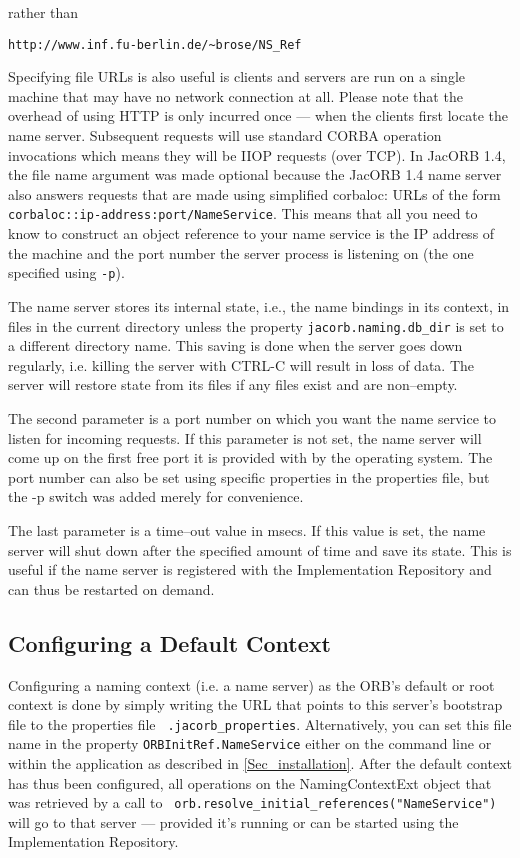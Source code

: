 \documentclass[12pt]{scrbook}
\begin{document}

rather than

\noindent\verb+http://www.inf.fu-berlin.de/~brose/NS_Ref+

Specifying file URLs is also useful is clients and servers are run on
a single machine that may have no network connection at all. Please
note that the overhead of using HTTP is only incurred once --- when
the clients first locate the name server.  Subsequent requests will
use standard CORBA operation invocations which means they will be IIOP
requests (over TCP). In JacORB 1.4, the file name argument was made
optional because the JacORB 1.4 name server also answers requests that
are made using simplified corbaloc: URLs of the form {\tt
  corbaloc::ip-address:port/NameService}. This means that all you need
to know to construct an object reference to your name service is the
IP address of the machine and the port number  the server process is
listening on (the one specified using {\tt -p}).

The name server stores its  internal state, i.e., the name bindings in
its context,  in files  in the current  directory unless  the property
{\tt jacorb.naming.db\_dir} is set to a different directory name. This
saving is done  when the server goes down  regularly, i.e. killing the
server  with CTRL-C  will result  in loss  of data.   The  server will
restore state from its files if any files exist and are non--empty.

The second  parameter is a port number on which you want the name
service to listen for incoming requests. If this parameter is not
set, the name server will come up on the first free port it is
provided with by the operating system. The port number can also be set
using specific properties in the properties file, but the -p switch
was added merely for convenience.

The last  parameter is a time--out  value in msecs. If  this value is
set, the name server will shut down after the specified amount of time
and save  its state. This is  useful if the name  server is registered
with  the  Implementation Repository  and  can  thus  be restarted  on
demand.

\subsection*{Configuring a Default Context}

Configuring a naming context (i.e. a name server) as the ORB's default
or root context is done by  simply writing the URL that points to this
server's    bootstrap    file   to    the    properties   file    {\tt
.jacorb\_properties}.  Alternatively,  you can  set this file  name in
the property {\tt ORBInitRef.NameService} either on the command line or
within the application  as described in \ref{Sec_installation}.  After
the default  context has thus  been configured, all operations  on the
NamingContextExt  object  that  was   retrieved  by  a  call  to  {\tt
orb.resolve\_initial\_references("NameService")}   will  go   to  that
server  ---  provided  it's  running  or  can  be  started  using  the
Implementation Repository.
\end{document}
